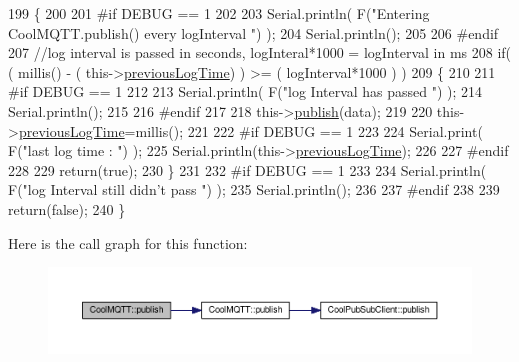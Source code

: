 \begin{DoxyCode}
199 \{
200 
201 \textcolor{preprocessor}{#if DEBUG == 1 }
202 
203     Serial.println( F(\textcolor{stringliteral}{"Entering CoolMQTT.publish() every logInterval "}) );
204     Serial.println();
205 
206 \textcolor{preprocessor}{#endif }
207     \textcolor{comment}{//log interval is passed in seconds, logInteral*1000 = logInterval in ms}
208     \textcolor{keywordflow}{if}( ( millis() - ( this->\hyperlink{class_cool_m_q_t_t_a3db37ef9ed3b05b2a8d44edba0e7d3cc}{previousLogTime})  ) >= ( logInterval*1000 ) )
209     \{
210     
211 \textcolor{preprocessor}{    #if DEBUG == 1}
212 
213         Serial.println( F(\textcolor{stringliteral}{"log Interval has passed "}) );
214         Serial.println();
215     
216 \textcolor{preprocessor}{    #endif}
217 
218         this->\hyperlink{class_cool_m_q_t_t_ace977b3e90ab14b1199fe5c4fb0a13ec}{publish}(data);
219 
220         this->\hyperlink{class_cool_m_q_t_t_a3db37ef9ed3b05b2a8d44edba0e7d3cc}{previousLogTime}=millis();
221     
222 \textcolor{preprocessor}{    #if DEBUG == 1 }
223 
224         Serial.print( F(\textcolor{stringliteral}{"last log time : "}) );
225         Serial.println(this->\hyperlink{class_cool_m_q_t_t_a3db37ef9ed3b05b2a8d44edba0e7d3cc}{previousLogTime});
226 
227 \textcolor{preprocessor}{    #endif}
228 
229         \textcolor{keywordflow}{return}(\textcolor{keyword}{true});
230     \}
231 
232 \textcolor{preprocessor}{#if DEBUG == 1 }
233 
234     Serial.println( F(\textcolor{stringliteral}{"log Interval still didn't pass "}) ); 
235     Serial.println();
236 
237 \textcolor{preprocessor}{#endif}
238 
239     \textcolor{keywordflow}{return}(\textcolor{keyword}{false});
240 \}
\end{DoxyCode}
Here is the call graph for this function\+:\nopagebreak
\begin{figure}[H]
\begin{center}
\leavevmode
\includegraphics[width=350pt]{d0/dd0/class_cool_m_q_t_t_a613c5e3927ae85bb94fbf648d84d8780_cgraph}
\end{center}
\end{figure}
\mbox{\label{class_cool_m_q_t_t_ae3c18f6ae9723746d32765f1c8f176ca}} 
